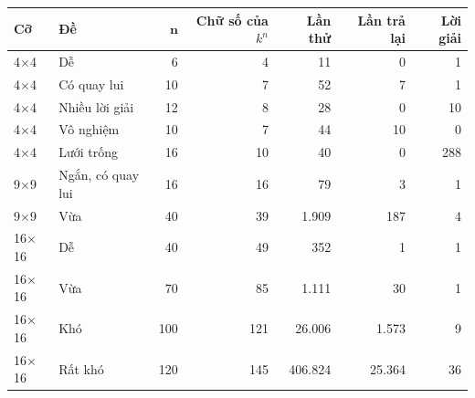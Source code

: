 \begin{tabular}{@{}llrrrrr@{}}
\toprule
\textbf{Cỡ} & \textbf{Đề} & \(\boldsymbol{n}\) & \textbf{Chữ số của \(k^n\)} & \textbf{Lần thử} & \textbf{Lần trả lại} & \textbf{Lời giải} \\
\midrule
4\(\times\)4 & Dễ & 6 & 4 & 11 & 0 & 1 \\
4\(\times\)4 & Có quay lui & 10 & 7 & 52 & 7 & 1 \\
4\(\times\)4 & Nhiều lời giải & 12 & 8 & 28 & 0 & 10 \\
4\(\times\)4 & Vô nghiệm & 10 & 7 & 44 & 10 & 0 \\
4\(\times\)4 & Lưới trống & 16 & 10 & 40 & 0 & 288 \\
\midrule
9\(\times\)9 & Ngắn, có quay lui & 16 & 16 & 79 & 3 & 1 \\
9\(\times\)9 & Vừa & 40 & 39 & 1.909 & 187 & 4 \\
\midrule
16\(\times\)16 & Dễ & 40 & 49 & 352 & 1 & 1 \\
16\(\times\)16 & Vừa & 70 & 85 & 1.111 & 30 & 1 \\
16\(\times\)16 & Khó & 100 & 121 & 26.006 & 1.573 & 9 \\
16\(\times\)16 & Rất khó & 120 & 145 & 406.824 & 25.364 & 36 \\
\bottomrule
\end{tabular}
